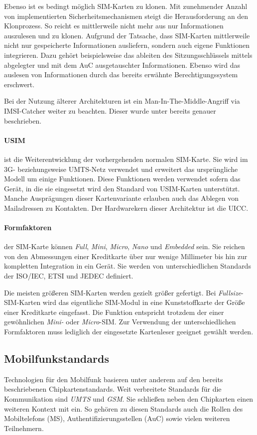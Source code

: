 Ebenso ist es bedingt möglich SIM-Karten zu klonen. Mit zunehmender Anzahl von implementierten
Sicherheitsmechanismen steigt die Herausforderung an den Klonprozess. So reicht es mittlerweile
nicht mehr aus nur Informationen auszulesen und zu klonen.
Aufgrund der Tatsache, dass SIM-Karten mittlerweile nicht nur gespeicherte Informationen
ausliefern, sondern auch eigene Funktionen integrieren.
Dazu gehört beispielsweise das ableiten des Sitzungsschlüssels
mittels abgelegter und mit dem \ac{AuC} ausgetauschter Informationen. Ebenso wird das auslesen
von Informationen durch das bereits erwähnte Berechtigungssystem erschwert.

Bei der Nutzung älterer Architekturen ist ein Man-In-The-Middle-Angriff via IMSI-Catcher weiter
zu beachten. Dieser wurde unter  bereits genauer beschrieben.

\paragraph{\ac{USIM}} ist die Weiterentwicklung der vorhergehenden normalen \ac{SIM}-Karte. Sie wird
im 3G- beziehungsweise UMTS-Netz verwendet und erweitert das ursprüngliche Modell um einige Funktionen.
Diese Funktionen werden verwendet sofern das Gerät, in die sie eingesetzt wird den Standard
von USIM-Karten unterstützt. Manche Ausprägungen dieser Kartenvariante erlauben auch das Ablegen
von Mailadressen zu Kontakten. Der Hardwarekern dieser Architektur ist die \ac{UICC}.

\paragraph{Formfaktoren} der SIM-Karte können \textit{Full}, \textit{Mini}, \textit{Micro},
\textit{Nano} und \textit{Embedded} sein. Sie reichen von den Abmessungen einer Kreditkarte über
nur wenige Millimeter bis hin zur kompletten Integration in ein Gerät. Sie werden von unterschiedlichen
Standards der ISO/IEC, ETSI und JEDEC definiert.

Die meisten größeren SIM-Karten werden gezielt größer gefertigt. Bei \textit{Fullsize}-SIM-Karten
wird das eigentliche SIM-Modul in eine Kunststoffkarte der Größe einer Kreditkarte eingefasst.
Die Funktion entspricht trotzdem der einer gewöhnlichen \textit{Mini-} oder \textit{Micro}-SIM.
Zur Verwendung der unterschiedlichen Formfaktoren muss lediglich der eingesetzte Kartenleser
geeignet gewählt werden.


\subsection{Mobilfunkstandards} %
Technologien für den Mobilfunk basieren unter anderem auf den bereits beschriebenen
Chipkartenstandards. Weit verbreitete Standards für die Kommunikation sind
\textit{UMTS} und \textit{GSM}. Sie schließen neben den Chipkarten einen weiteren
Kontext mit ein. So gehören zu diesen Standards auch die Rollen des Mobiltelefons (\ac{MS}),
Authentifizierungsstellen (\ac{AuC}) sowie vielen weiteren Teilnehmern.

